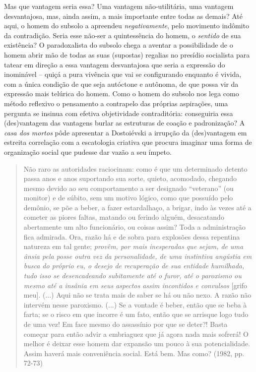 Mas que vantagem seria essa? Uma vantagem não-utilitária, uma vantagem
desvantajosa, mas, ainda assim, a mais importante entre todas as demais?
Até aqui, o homem do subsolo a apreendeu \emph{negativamente}, pelo
movimento indômito da contradição. Seria esse não-ser a quintessência do
homem, o \emph{sentido} de sua existência? O paradoxalista do subsolo
chega a aventar a possibilidade de o homem abrir mão de todas as suas
(supostas) regalias no presídio socialista para tatear em direção a essa
vantagem desvantajosa que seria a expressão do inominável -- quiçá a
pura vivência que vai se configurando enquanto é vivida, com a única
condição de que seja autóctone e autônoma, de que possa vir da expressão
mais telúrica do homem. Como o homem do subsolo nos lega como método
reflexivo o pensamento a contrapelo das próprias aspirações, uma
pergunta se insinua com efetiva objetividade contraditória: conseguiria
essa (des)vantagem das vantagens burlar as estruturas de coação e
padronização? A \emph{casa dos mortos} pôde apresentar a Dostoiévski a
irrupção da (des)vantagem em estreita correlação com a escatologia
criativa que procura imaginar uma forma de organização social que
pudesse dar vazão a seu ímpeto.

\begin{quote}
Não raro as autoridades raciocinam: como é que um determinado detento
passa anos e anos suportando sua sorte, quieto, acomodado, chegando
mesmo devido ao seu comportamento a ser designado ``veterano'' (ou
monitor) e de súbito, sem um motivo lógico, como que possuído pelo
demônio, se põe a beber, a fazer estardalhaço, a brigar, indo às vezes
até a cometer as piores faltas, matando ou ferindo alguém, desacatando
abertamente um alto funcionário, ou coisas assim? Toda a administração
fica admirada. Ora, razão há e de sobra para explosões dessa repentina
natureza em tal gente; \emph{provêm, por mais inesperadas que sejam, de
uma ânsia pela posse outra vez da personalidade, de uma instintiva
angústia em busca do próprio eu, o desejo de recuperação de sua entidade
humilhada, tudo isso se desencadeando subitamente até o furor, até o
paroxismo ou mesmo até a insânia em seus aspectos assim incontidos e
convulsos} {[}grifo meu{]}. (...) Aqui não se trata mais de saber se há
ou não nexo. A razão não intervém nesse paroxismo. (...) Se a vontade é
beber, então que se beba à farta; se o risco em que incorre é um fato,
então que se arrisque logo tudo de uma vez! Em face mesmo do assassínio
por que se deter?! Basta começar para então advir a embriaguez que já
agora nada mais sofrerá! O melhor é deixar esse homem dar expansão um
pouco à sua potencialidade. Assim haverá mais conveniência social. Está
bem. Mas como? (1982, pp. 72-73)
\end{quote}


